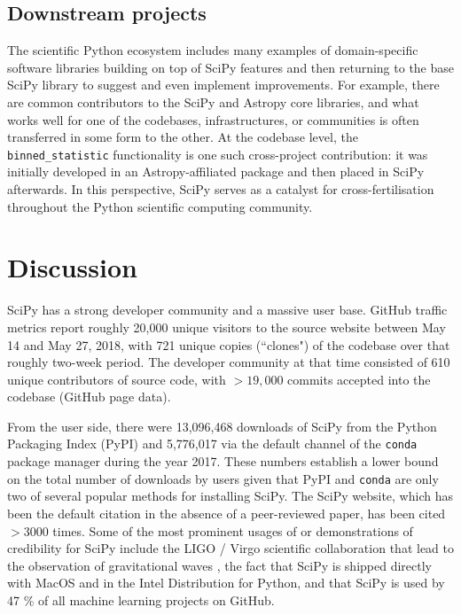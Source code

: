 \documentclass[fleqn,10pt]{wlscirep}
\begin{document}
\subsection*{Downstream projects}

The scientific Python ecosystem includes many examples
of domain-specific software libraries building on top
of SciPy features and then returning to the base SciPy library
to suggest and even implement improvements. 
For example, there are common contributors to the SciPy and 
Astropy core libraries\cite{astropy-2018}, and what works 
well for one of the codebases, infrastructures, or communities
is often transferred in some form to the other. At the codebase
level, the \texttt{binned\_statistic} functionality
is one such cross-project contribution: it was initially
developed in an Astropy-affiliated package
and then placed in SciPy afterwards. 
In this perspective, SciPy serves as a catalyst for cross-fertilisation 
throughout the Python scientific computing community.

\section*{Discussion}


SciPy has a strong developer community and a massive user base. GitHub traffic
metrics report roughly 20,000 unique visitors to the source website between May
14 and May 27, 2018, with 721 unique copies (``clones") of the codebase over
that roughly two-week period. The developer community at that time consisted of 610 unique
contributors of source code, with $>19,000$ commits accepted into the codebase
(GitHub page data).

From the user side, there were 13,096,468 downloads of SciPy from the Python
Packaging Index (PyPI)\cite{pypinfo} and 5,776,017 via the default channel of the
\texttt{conda}\cite{condainfo} package manager during the year 2017. These numbers establish a lower
bound on the total number of downloads by users given that
PyPI and \texttt{conda} are only two of several popular methods for installing SciPy.  The SciPy
website\cite{SciPylib}, which has been the default citation in the absence of a
peer-reviewed paper, has been cited $>3000$ times\cite{googlescholar}. Some of the most prominent
usages of or demonstrations of credibility for SciPy include the LIGO / Virgo
scientific collaboration that lead to the observation of gravitational waves
\cite{PhysRevLett.116.061102}, the fact that SciPy is shipped directly with
MacOS and in the Intel Distribution for Python\cite{intel-python}, and that SciPy is used
by 47 \% of all machine learning projects on GitHub\cite{octoverse-scipy}.
\end{document}
